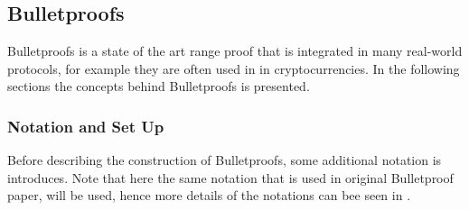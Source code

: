 \subsection{Bulletproofs}
Bulletproofs is a state of the art range proof that is integrated in many real-world protocols,  for example they are often used in in cryptocurrencies. In the following sections the concepts behind Bulletproofs is presented. 

\subsubsection*{Notation and Set Up}
Before describing the construction of Bulletproofs, some additional notation is introduces.  Note that here the same notation  that is used in original Bulletproof paper, will be used, hence more details of the notations can bee seen in \cite{bulletProofs_theory} . 




